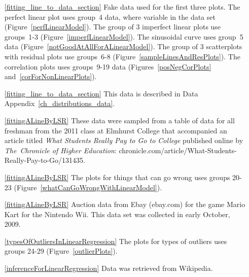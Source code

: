 \begin{itemize}
\item[\ref{fitting_line_to_data_section}]
    Fake data used for the first three plots.
    The perfect linear plot uses group~4 data,
    where  variable in the data set
    (Figure~\ref{perfLinearModel}).
    The group of 3 imperfect linear plots use groups~1-3
    (Figure~\ref{imperfLinearModel}).
    The sinusoidal curve uses group~5 data
    (Figure~\ref{notGoodAtAllForALinearModel}).
    The group of 3 scatterplots with residual plots use groups~6-8
    (Figure~\ref{sampleLinesAndResPlots}).
    The correlation plots uses groups~9-19 data
    (Figures~\ref{posNegCorPlots} and~\ref{corForNonLinearPlots}).
\item[\ref{fitting_line_to_data_section}]
    This data is described in
    Data Appendix~\ref{ch_distributions_data}.

\item[\ref{fittingALineByLSR}]
    These data were sampled from a table of data for all
    freshman from the 2011 class at Elmhurst College that
    accompanied an article titled
    \emph{What Students Really Pay to Go to College}
    published online by \emph{The~Chronicle of Higher Education}:
        {chronicle.com/article/What-Students-Really-Pay-to-Go/131435}.
\item[\ref{fittingALineByLSR}]
    The plots for things that can go wrong uses groups 20-23
    (Figure~\ref{whatCanGoWrongWithLinearModel}).
\item[\ref{fittingALineByLSR}]
    Auction data from Ebay (ebay.com) for the game Mario Kart
    for the Nintendo Wii.
    This data set was collected in early October, 2009.

\item[\ref{typesOfOutliersInLinearRegression}]
    The plots for types of outliers uses groups 24-29
    (Figure~\ref{outlierPlots}).

\item[\ref{inferenceForLinearRegression}]
    Data was retrieved from Wikipedia.

\end{itemize}







